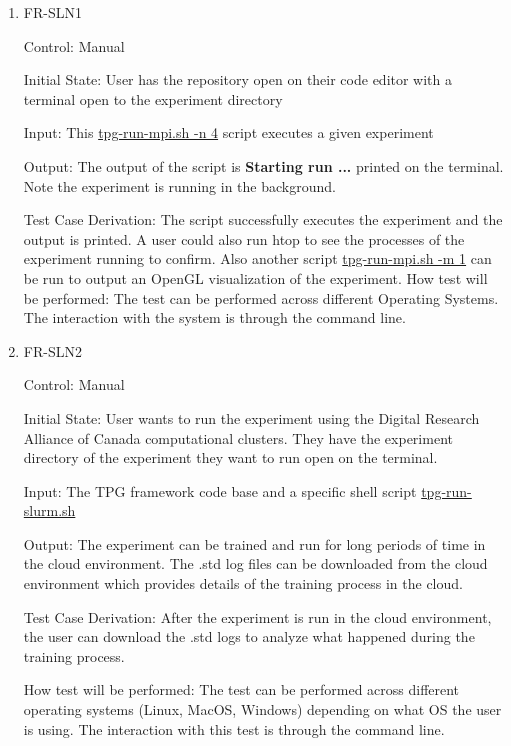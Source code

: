 \documentclass[12pt, titlepage]{article}
\begin{document}
\begin{enumerate}

\item{FR-SLN1}

Control: Manual
					
Initial State: User has the repository open on their code editor with a terminal open to the experiment directory
					
Input: This \href{https://github.com/TPGEngine/tpg/blob/main/src/scripts/run/tpg-run-mpi.sh}{tpg-run-mpi.sh -n 4} script executes a given experiment
					
Output: The output of the script is \textbf{Starting run ...} printed on the terminal. Note the experiment is running in the background.

Test Case Derivation: The script successfully executes the experiment and the output is printed. A user could also run htop to see the processes of the experiment running to confirm. Also another script \href{https://github.com/TPGEngine/tpg/blob/main/src/scripts/run/tpg-run-mpi.sh}{tpg-run-mpi.sh -m 1} can be run to output an OpenGL visualization of the experiment. 
How test will be performed: The test can be performed across different Operating Systems. The interaction with the system is through the command line.
					
\item{FR-SLN2}

Control: Manual
					
Initial State: User wants to run the experiment using the Digital Research Alliance of Canada computational clusters. They have the experiment directory of the experiment they want to run open on the terminal.
					
Input: The TPG framework code base and a specific shell script \href{https://github.com/TPGEngine/tpg/blob/main/src/scripts/run/tpg-run-slurm.sh}{tpg-run-slurm.sh}
					
Output: The experiment can be trained and run for long periods of time in the cloud environment. The .std log files can be downloaded from the cloud environment which provides details of the training process in the cloud.

Test Case Derivation: After the experiment is run in the cloud environment, the user can download the .std logs to analyze what happened during the training process.

How test will be performed: The test can be performed across different operating systems (Linux, MacOS, Windows) depending on what OS the user is using. The interaction with this test is through the command line.

\end{enumerate}
\end{document}
